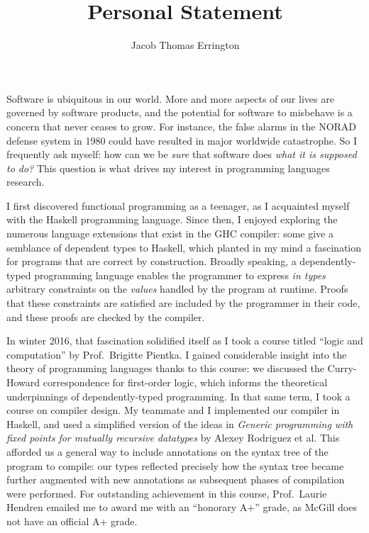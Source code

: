 \documentclass[11pt,letterpaper]{article}
\author{Jacob Thomas Errington}
\title{Personal Statement}
\date{}
\begin{document}
\maketitle

Software is ubiquitous in our world. More and more aspects of our lives are
governed by software products, and the potential for software to misbehave is a
concern that never ceases to grow.
For instance, the false alarms in the NORAD defense system in 1980 could have
resulted in major worldwide catastrophe.
So I frequently ask myself: how can we be \emph{sure} that software does
\emph{what it is supposed to do?}
This question is what drives my interest in programming languages research.

I first discovered functional programming as a teenager, as I acquainted myself
with the Haskell programming language.
Since then, I enjoyed exploring the numerous language extensions that exist in
the GHC compiler:
some give a semblance of dependent types to Haskell, which planted in
my mind a fascination for programs that are correct by construction.
Broadly speaking, a dependently-typed programming language enables the
programmer to express \emph{in types} arbitrary constraints on the
\emph{values} handled by the program at runtime.
Proofs that these constraints are satisfied are included by the programmer
in their code, and these proofs are checked by the compiler.

In winter 2016, that fascination solidified itself as I took a course titled
``logic and computation'' by Prof.~Brigitte Pientka.
I gained considerable insight into the theory of programming languages thanks
to this course: we discussed the Curry-Howard correspondence for first-order
logic, which informs the theoretical underpinnings of dependently-typed
programming.
%
In that same term, I took a course on compiler design. My teammate and I
implemented our compiler in Haskell, and used a simplified version of the ideas
in \textit{Generic programming with fixed points for mutually recursive
datatypes} by Alexey Rodriguez et al.
This afforded us a general way to include annotations on the syntax tree of the
program to compile: our types reflected precisely how the syntax tree became
further augmented with new annotations as subsequent phases of compilation were
performed.
%
For outstanding achievement in this course, Prof.~Laurie Hendren emailed me to
award me with an ``honorary A+'' grade, as McGill does not have an official A+
grade.
\end{document}
